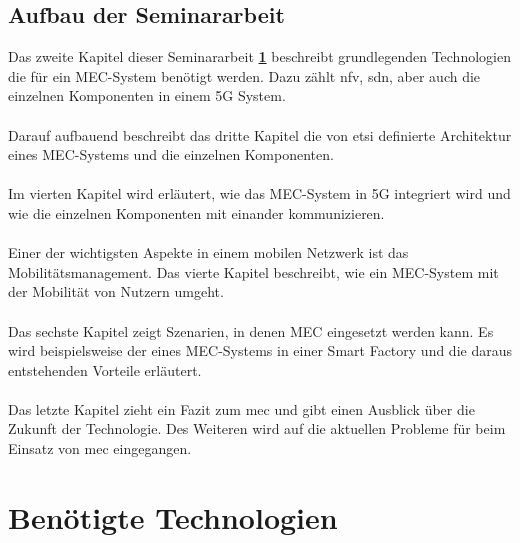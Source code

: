 \documentclass[runningheads]{llncs}
\numberwithin{figure}{section}
\begin{document}
\subsection{Aufbau der Seminararbeit}
Das zweite Kapitel dieser Seminararbeit \textbf{ \ref{sec:Benötigte Technologien}} beschreibt
grundlegenden Technologien die für ein MEC-System benötigt werden. 
Dazu zählt \acrfull{nfv}, \acrfull{sdn}, aber auch die einzelnen  Komponenten in einem 5G System.
\\
\\
Darauf aufbauend beschreibt das dritte Kapitel die von \acrlong{etsi} definierte Architektur eines MEC-Systems und die einzelnen Komponenten.
\\
\\
Im vierten Kapitel wird erläutert, wie das MEC-System in 5G integriert wird und wie die einzelnen Komponenten mit einander kommunizieren.
\\
\\
Einer der wichtigsten Aspekte in einem mobilen Netzwerk ist das Mobilitätsmanagement. Das vierte Kapitel beschreibt, wie ein MEC-System mit der Mobilität von
Nutzern umgeht.
\\
\\
Das sechste Kapitel zeigt Szenarien, 
in denen MEC eingesetzt werden kann. Es wird beispielsweise der eines MEC-Systems in einer Smart Factory und die daraus entstehenden
Vorteile erläutert.
\\
\\
Das letzte Kapitel zieht ein Fazit zum \acrlong{mec} und gibt einen Ausblick über die Zukunft der Technologie. 
Des Weiteren wird auf die aktuellen Probleme für beim Einsatz von \acrshort{mec} eingegangen.



\newpage
\section{Benötigte Technologien}
\label{sec:Benötigte Technologien}
\end{document}
